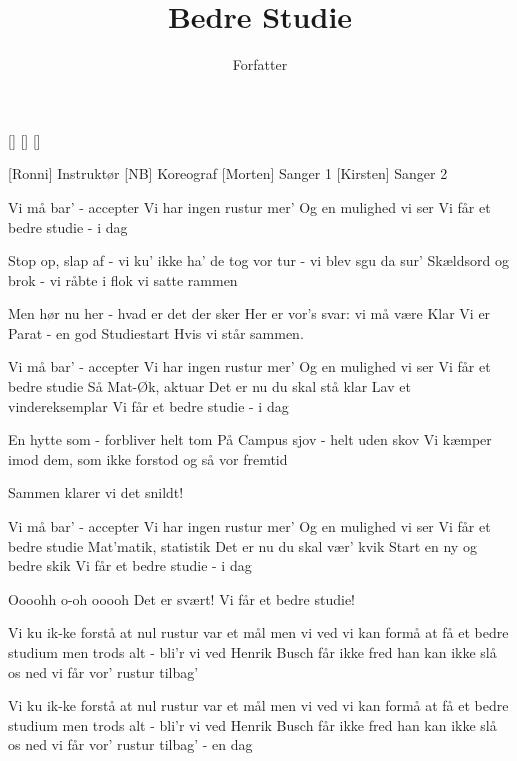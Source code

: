 \documentclass[a4paper,11pt]{article}
\title{Bedre Studie}
\author{Forfatter}
\begin{document}
\maketitle

\begin{props}
[]
[]
[]
\end{props}

\begin{roles}
[Ronni] Instruktør
[NB] Koreograf
[Morten] Sanger 1
[Kirsten] Sanger 2
\end{roles}

\begin{song}
 Vi må bar' - accepter
Vi har ingen rustur mer'
Og en mulighed vi ser
Vi får et bedre studie - i dag

Stop op, slap af - vi ku' ikke ha'
de tog vor tur - vi blev sgu da sur'
Skældsord og brok - vi råbte i flok
vi satte rammen

Men hør nu her - hvad er det der sker
Her er vor's svar: vi må være Klar
Vi er Parat - en god Studiestart
Hvis vi står sammen.

Vi må bar' - accepter
Vi har ingen rustur mer'
Og en mulighed vi ser
Vi får et bedre studie
Så Mat-Øk, aktuar
Det er nu du skal stå klar
Lav et vindereksemplar
Vi får et bedre studie - i dag

En hytte som - forbliver helt tom
På Campus sjov - helt uden skov
Vi kæmper imod dem, som ikke forstod
og så vor fremtid

Sammen klarer vi det snildt!

Vi må bar' - accepter
Vi har ingen rustur mer'
Og en mulighed vi ser
Vi får et bedre studie
Mat'matik, statistik
Det er nu du skal vær' kvik
Start en ny og bedre skik
Vi får et bedre studie - i dag

Oooohh o-oh ooooh
Det er svært!
Vi får et bedre studie!

Vi ku ik-ke forstå
at nul rustur var et mål
men vi ved vi kan formå
at få et bedre studium
men trods alt - bli'r vi ved
Henrik Busch får ikke fred
han kan ikke slå os ned
vi får vor' rustur tilbag'

Vi ku ik-ke forstå
at nul rustur var et mål
men vi ved vi kan formå
at få et bedre studium
men trods alt - bli'r vi ved
Henrik Busch får ikke fred
han kan ikke slå os ned
vi får vor' rustur tilbag' - en dag
\end{song}
\end{document}
